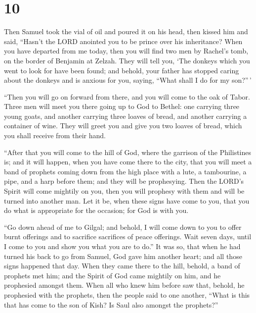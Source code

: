 \hypertarget{section-9}{%
\section{10}\label{section-9}}

 Then Samuel took the vial of oil and poured it on his head,
then kissed him and said, ``Hasn't the LORD anointed you to be prince
over his inheritance?  When you have departed from me today,
then you will find two men by Rachel's tomb, on the border of Benjamin
at Zelzah. They will tell you, `The donkeys which you went to look for
have been found; and behold, your father has stopped caring about the
donkeys and is anxious for you, saying, ``What shall I do for my
son?''\,'

 ``Then you will go on forward from there, and you will come
to the oak of Tabor. Three men will meet you there going up to God to
Bethel: one carrying three young goats, and another carrying three
loaves of bread, and another carrying a container of wine. 
They will greet you and give you two loaves of bread, which you shall
receive from their hand.

 ``After that you will come to the hill of God, where the
garrison of the Philistines is; and it will happen, when you have come
there to the city, that you will meet a band of prophets coming down
from the high place with a lute, a tambourine, a pipe, and a harp before
them; and they will be prophesying.  Then the LORD's Spirit
will come mightily on you, then you will prophesy with them and will be
turned into another man.  Let it be, when these signs have
come to you, that you do what is appropriate for the occasion; for God
is with you.

 ``Go down ahead of me to Gilgal; and behold, I will come
down to you to offer burnt offerings and to sacrifice sacrifices of
peace offerings. Wait seven days, until I come to you and show you what
you are to do.''  It was so, that when he had turned his
back to go from Samuel, God gave him another heart; and all those signs
happened that day.  When they came there to the hill,
behold, a band of prophets met him; and the Spirit of God came mightily
on him, and he prophesied amongst them.  When all who knew
him before saw that, behold, he prophesied with the prophets, then the
people said to one another, ``What is this that has come to the son of
Kish? Is Saul also amongst the prophets?''

